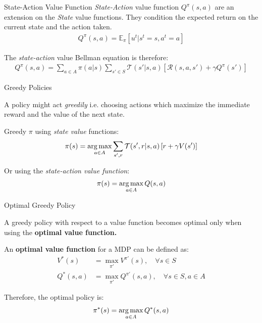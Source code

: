 \begin{frame}{State-Action Value Function}
    \textit{State-Action} value function $Q^{\pi}(s,a)$ are an extension on the \textit{State} value functions. They condition the expected return on the current state and the action taken.
    \begin{align*}
         Q^{\pi}(s,a) = \mathbb{E}_{\pi}\left[u^{t}|s^{t}=s, a^{t}=a\right]
    \end{align*}

The \textit{state-action} value Bellman equation is therefore:
\vspace{10pt}
\begin{align*}
    Q^{\pi}(s,a) = \sum_{a \in A} \pi(a|s) \sum_{s' \in S} \mathcal{T}(s'|s,a) \left[\mathcal{R}(s,a,s') + \gamma Q^{\pi}(s')\right]
\end{align*}

\end{frame}

\begin{frame}{Greedy Policies}

    A policy might act \textit{greedily} i.e. choosing actions which maximize the immediate reward and the value of the next state.
    \vspace{10pt}
    
    Greedy $\pi$ using \textit{state value} functions:
    \vspace{5pt}    
    \begin{align*}
       \pi(s) = \operatorname*{arg\,max}_{a \in A} \sum_{s', r} \mathcal{T}(s', r | s, a) \left[ r + \gamma V(s') \right]
    \end{align*}
    
    Or using the \textit{state-action value function}:
    \vspace{5pt}
    \begin{align*}
        \pi(s) = \operatorname*{arg\,max}_{a \in A}Q(s, a)    
    \end{align*}
    
\end{frame}

\begin{frame}{Optimal Greedy Policy}

   A greedy policy with respect to a value function becomes optimal only when using the \textbf{optimal value function.} 
    
    An \textbf{optimal value function} for a MDP can be defined as:
    \vspace{5pt}
    \begin{align*}
        V^{*}(s) &= \max_{\pi'} V^{\pi'}(s), \quad \forall s \in S \\
        Q^{*}(s, a) &= \max_{\pi'} Q^{\pi'}(s, a), \quad \forall s \in S, a \in A
    \end{align*}

    Therefore, the optimal policy is:
    \vspace{5pt}
    \begin{align*}
        \pi^{*}(s) = \operatorname*{arg\,max}_{a \in A}Q^{*}(s, a)    
    \end{align*}
\end{frame}


